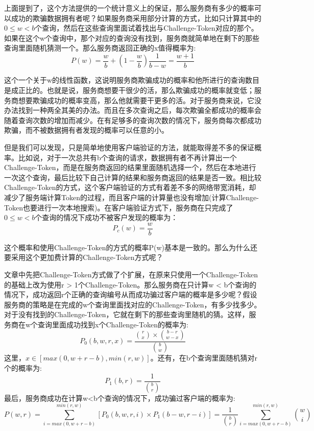 上面提到了，这个方法提供的一个统计意义上的保证，那么服务商有多少的概率可以成功的欺骗数据拥有者呢？如果服务商采用部分计算的方式，比如只计算其中的$0 \le w < b$个查询，然后在这些查询里面试着找出与Challenge-Token对应的那个。如果在这个w个查询中，那个对应的查询没有找到，服务商就简单地在剩下的那些查询里面随机猜测一个。那么服务商返回正确的x值得概率为:
\begin{equation} P(w) = \frac{w}{b} + (1 - \frac{w}{b})\frac{1}{b-w} = \frac{w + 1}{b} \end{equation}

这个一个关于w的线性函数，这说明服务商欺骗成功的概率和他所进行的查询数目是成正比的。也就是说，服务商想要干很少的活，那么欺骗成功的概率就变低；服务商想要欺骗成功的概率变高，那么他就需要干更多的活。对于服务商来说，它没办法找到一种两全其美的办法。而且在多次查询之后，每次欺骗全都成功的概率会随着查询次数的增加而减少。在有足够多的查询次数的情况下，服务商每次都成功欺骗，而不被数据拥有者发现的概率可以任意的小。

但是我们可以发现，只是简单地使用客户端验证的方法，就能取得差不多的保证概率。比如说，对于一次总共有b个查询的请求，数据拥有者不再计算出一个Challenge-Token，而是在服务商返回的结果里面随机选择一个，然后在本地进行一次这个查询，最后比较下自己计算的结果和服务商返回的结果是否一致。相比较Challenge-Token的方式，这个客户端验证的方式有着差不多的网络带宽消耗，却减少了服务端计算Token的过程，而且客户端的计算量也没有增加(计算Challenge-Token也要进行一次本地搜索)。在客户端验证方式下，服务商在只完成了$0 \le w < b$个查询的情况下成功不被客户发现的概率为：
\begin{equation} P_c(w) = \frac{w}{b} \end{equation}

这个概率和使用Challenge-Token的方式的概率P(w)基本是一致的。那么为什么还要采用这个更加费计算的Challenge-Token方式呢？

文章中先把Challenge-Token方式做了个扩展，在原来只使用一个Challenge-Token的基础上改为使用r > 1个Challenge-Token。那么服务商在只计算w < b个查询的情况下，成功返回r个正确的查询编号从而成功骗过客户端的概率是多少呢？假设服务商的策略是在完成的w个查询里面找对应的Challenge-Token，有多少找多少。对于没有找到的Challenge-Token，它就在剩下的那些查询里随机的猜。这样，服务商在w个查询里面成功找到x个Challenge-Token的概率为:
\begin{equation} P_0(b, w, r, x) = \frac{\binom{r}{x} \times \binom{b-r}{w-x}}{\binom{b}{w}} \end{equation}
这里，$x \in [max(0, w+r-b), min(r,w)]$。还有，在b个查询里面随机猜对r个的概率为:
\begin{equation} P_1(b,r) = \frac{1}{\binom{b}{r}} \end{equation}
最后，服务商成功在计算w<b个查询的情况下，成功骗过客户端的概率为:
\begin{equation} P(w,r) = \sum_{i=max(0,w+r-b)}^{min(r,w)} [P_0(b,w,r,i) \times P_1(b-w,r-i)] = \frac{1}{\binom{b}{r}}\sum_{i=max(0,w+r-b)}^{min(r,w)}\binom{w}{i} \end{equation}

